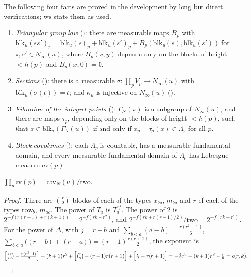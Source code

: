 The following four facts are proved in the development by long but direct verifications; we state them as used.
\begin{enumerate}[label=(B\arabic*)]
\item\label{pf:sh-siegel:B1} \emph{Triangular group law} (): there are
measurable maps $B_p$ with $\mathrm{blk}_u(ss')_p=\mathrm{blk}_u(s)_p+\mathrm{blk}_u(s')_p+B_p(\mathrm{blk}_u(s),\mathrm{blk}_u(s'))$
for $s,s'\in N_\infty(u)$, where $B_p(x,y)$ depends only on the blocks of height $<h(p)$ and $B_p(x,0)=0$.
\item\label{pf:sh-siegel:B2} \emph{Sections} (): there is a measurable
$\sigma\colon\prod_pV_p\to N_\infty(u)$ with $\mathrm{blk}_u(\sigma(t))=t$; and $\kappa_u$ is injective on $N_\infty(u)$
().
\item\label{pf:sh-siegel:B3} \emph{Fibration of the integral points} ():
$\Gamma_N(u)$ is a subgroup of $N_\infty(u)$, and there are maps $\tau_p$, depending only on the blocks of height $<h(p)$, such
that $x\in\mathrm{blk}_u(\Gamma_N(u))$ if and only if $x_p-\tau_p(x)\in\Lambda_p$ for all $p$.
\item\label{pf:sh-siegel:B4} \emph{Block covolumes} (): each
$\Lambda_p$ is countable, has a measurable fundamental domain, and every measurable fundamental domain of $\Lambda_p$ has
Lebesgue measure $\mathrm{cv}(p)$.
\end{enumerate}

\begin{lemma}\label{pf:sh-siegel:cvprod}
$\prod_p\mathrm{cv}(p)=\mathrm{cov}_N(u)/\mathrm{two}$.
\end{lemma}

\begin{proof}
There are $\binom r2$ blocks of each of the types $x_{ba}$, $m_{ba}$ and $r$ of each of the types $\mathrm{row}_b$, $m_{aa}$. The
power of $T_u$ is $T_u^{rf}$. The power of $2$ is $2^{-f(r(r-1)+r(k+1))}=2^{-f(rk+r^2)}$, and $2^{-f(rk+r(r-1)/2)}/\mathrm{two}=
2^{-f(rk+r^2)}$. For the power of $\Delta$, with $j=r-b$ and $\sum_{b<a}(a-b)=\frac{r(r^2-1)}6$,
$\sum_{b<a}\bigl((r-b)+(r-a)\bigr)=(r-1)\frac{r(r+1)}2$, the exponent is
\[
\Bigl[\tbinom r2-\tfrac{r(r^2-1)}3\Bigr]-(k+1)r^2+\Bigl[\tbinom r2-(r-1)r(r+1)\Bigr]+\Bigl[\tfrac r2-r(r+1)\Bigr]
=-\tfrac43r^3-(k+1)r^2-\tfrac r6=c(r,k).\qedhere
\]
\end{proof}

